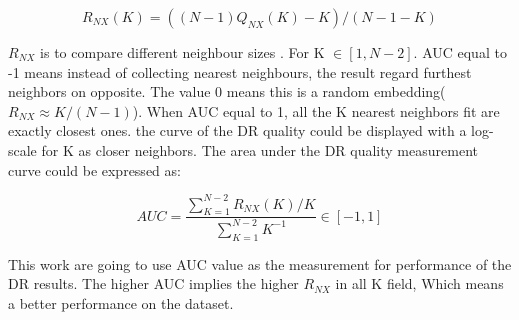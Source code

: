 \begin{equation*}
    R_{NX} (K) = ((N − 1)Q_{NX} (K) − K) /(N − 1 − K)
\end{equation*}

\noindent $R_{NX}$ is to compare different neighbour sizes \cite{ref11}. For K $\in [1, N-2]$. AUC equal to -1 means instead of collecting nearest neighbours, the result regard furthest neighbors on opposite. The value 0 means this is a random embedding($R_{NX} \approx K/(N-1)$)\cite{ref4}. When AUC equal to 1, all the K nearest neighbors fit are exactly closest ones. the curve of the DR quality could be displayed with a log-scale for K as closer neighbors. The area under the DR quality measurement curve could be expressed as:

\begin{equation*}
    AUC  = \frac{ \sum_{K=1}^{N-2} R_{NX}(K)/K}{\sum_{K=1}^{N-2}K^{-1}}   \in [-1,1]
\end{equation*}

\noindent This work are going to use AUC value as the measurement for performance of the DR results. The higher AUC implies the higher $R_{NX}$ in all K field, Which means a better performance on the dataset.